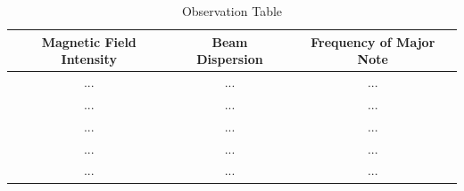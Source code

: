 \begin{table}[h!]
\centering
\begin{tabular}{||c c c||} 
 \hline
 Magnetic Field Intensity & Beam Dispersion & Frequency of Major Note\\ [0.5ex] 
 \hline\hline
 ... & ... & ... \\ 
 ... & ... & ... \\
 ... & ... & ... \\
 ... & ... & ... \\
 ... & ... & ... \\ [1ex] 
 \hline
\end{tabular}
\caption{Observation Table}
\label{table:1}
\end{table}